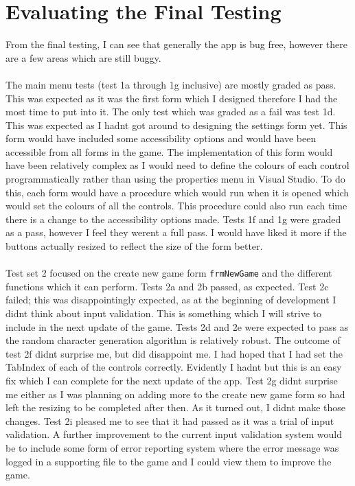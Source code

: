 \section{Evaluating the Final Testing}
From the final testing, I can see that generally the app is bug free, however there are a few areas which are still buggy.\\ \\
The main menu tests (test 1a through 1g inclusive) are mostly graded as pass. This was expected as it was the first form which I designed therefore I had the most time to put into it. The only test which was graded as a fail was test 1d. This was expected as I hadn\textquotesingle t got around to designing the settings form yet. This form would have included some accessibility options and would have been accessible from all forms in the game. The implementation of this form would have been relatively complex as I would need to define the colours of each control programmatically rather than using the properties menu in Visual Studio. To do this, each form would have a procedure which would run when it is opened which would set the colours of all the controls. This procedure could also run each time there is a change to the accessibility options made. Tests 1f and 1g were graded as a pass, however I feel they weren\textquotesingle t a full pass. I would have liked it more if the buttons actually resized to reflect the size of the form better. \\ \\
Test set 2 focused on the create new game form \verb|frmNewGame| and the different functions which it can perform. Tests 2a and 2b passed, as expected. Test 2c failed; this was disappointingly expected, as at the beginning of development I didn\textquotesingle t think about input validation. This is something which I will strive to include in the next update of the game. Tests 2d and 2e were expected to pass as the random character generation algorithm is relatively robust. The outcome of test 2f didn\textquotesingle t surprise me, but did disappoint me. I had hoped that I had set the TabIndex of each of the controls correctly. Evidently I hadn\textquotesingle t but this is an easy fix which I can complete for the next update of the app. Test 2g didn\textquotesingle t surprise me either as I was planning on adding more to the create new game form so had left the resizing to be completed after then. As it turned out, I didn\textquotesingle t make those changes. Test 2i pleased me to see that it had passed as it was a trial of input validation. A further improvement to the current input validation system would be to include some form of error reporting system where the error message was logged in a supporting file to the game and I could view them to improve the game. \\ \\
